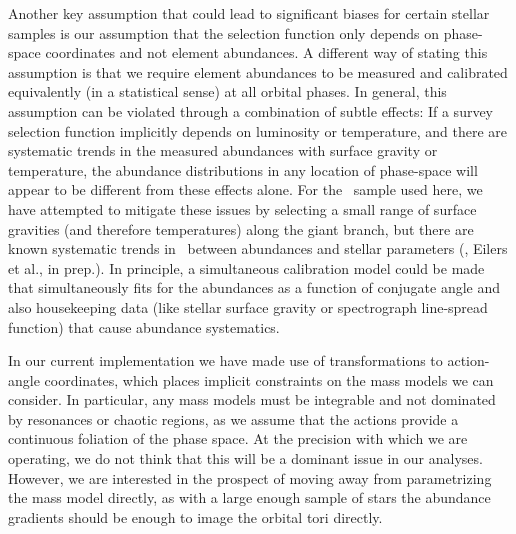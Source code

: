 \documentclass[modern]{aastex63}
\newcommand{\apogee}{\acronym{APOGEE}}
\begin{document}
Another key assumption that could lead to significant biases for certain stellar
samples is our assumption that the selection function only depends on
phase-space coordinates and not element abundances.
A different way of stating this assumption is that we require element abundances
to be measured and calibrated equivalently (in a statistical sense) at all
orbital phases.
In general, this assumption can be violated through a combination of subtle
effects: If a survey selection function implicitly depends on luminosity or
temperature, and there are systematic trends in the measured abundances with
surface gravity or temperature, the abundance distributions in any location of
phase-space will appear to be different from these effects alone.
For the \apogee\ sample used here, we have attempted to mitigate these issues by
selecting a small range of surface gravities (and therefore temperatures) along
the giant branch, but there are known systematic trends in \apogee\ between
abundances and stellar parameters (\citealt{Jonsson:2020, Wheeler:2020}, Eilers
et al., in prep.).
In principle, a simultaneous calibration model could be made that simultaneously
fits for the abundances as a function of conjugate angle and also housekeeping
data (like stellar surface gravity or spectrograph line-spread function) that
cause abundance systematics.

In our current implementation we have made use of transformations to
action-angle coordinates, which places implicit constraints on the mass models
we can consider.
In particular, any mass models must be integrable and not dominated by
resonances or chaotic regions, as we assume that the actions provide a
continuous foliation of the phase space.
At the precision with which we are operating, we do not think that this will be
a dominant issue in our analyses.
However, we are interested in the prospect of moving away from parametrizing the
mass model directly, as with a large enough sample of stars the abundance
gradients should be enough to image the orbital tori directly.
\end{document}
